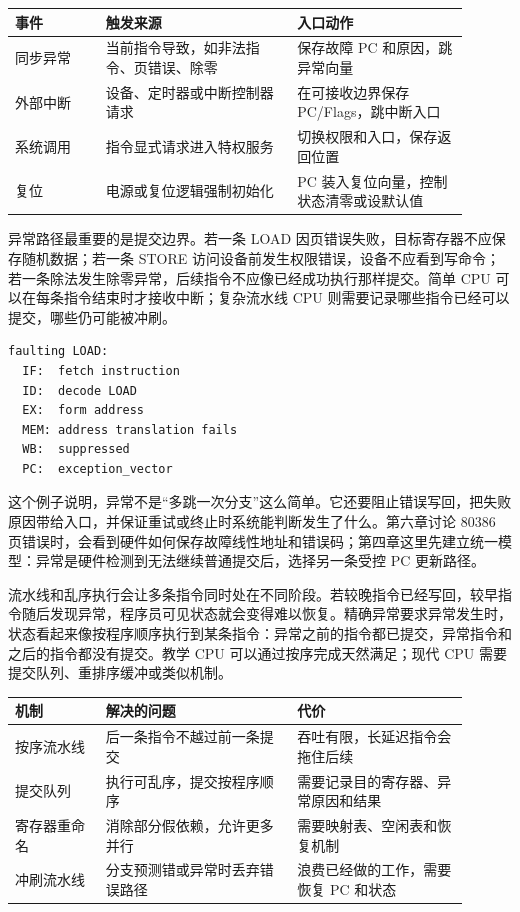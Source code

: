 \begin{longtable}{L{0.18\linewidth}L{0.38\linewidth}L{0.34\linewidth}}
\toprule
事件 & 触发来源 & 入口动作 \\
\midrule
同步异常 & 当前指令导致，如非法指令、页错误、除零 & 保存故障 PC 和原因，跳异常向量 \\
外部中断 & 设备、定时器或中断控制器请求 & 在可接收边界保存 PC/Flags，跳中断入口 \\
系统调用 & 指令显式请求进入特权服务 & 切换权限和入口，保存返回位置 \\
复位 & 电源或复位逻辑强制初始化 & PC 装入复位向量，控制状态清零或设默认值 \\
\bottomrule
\end{longtable}

异常路径最重要的是提交边界。若一条 LOAD 因页错误失败，目标寄存器不应保存随机数据；若一条 STORE 访问设备前发生权限错误，设备不应看到写命令；若一条除法发生除零异常，后续指令不应像已经成功执行那样提交。简单 CPU 可以在每条指令结束时才接收中断；复杂流水线 CPU 则需要记录哪些指令已经可以提交，哪些仍可能被冲刷。

\begin{lstlisting}
faulting LOAD:
  IF:  fetch instruction
  ID:  decode LOAD
  EX:  form address
  MEM: address translation fails
  WB:  suppressed
  PC:  exception_vector
\end{lstlisting}

这个例子说明，异常不是“多跳一次分支”这么简单。它还要阻止错误写回，把失败原因带给入口，并保证重试或终止时系统能判断发生了什么。第六章讨论 80386 页错误时，会看到硬件如何保存故障线性地址和错误码；第四章这里先建立统一模型：异常是硬件检测到无法继续普通提交后，选择另一条受控 PC 更新路径。

流水线和乱序执行会让多条指令同时处在不同阶段。若较晚指令已经写回，较早指令随后发现异常，程序员可见状态就会变得难以恢复。精确异常要求异常发生时，状态看起来像按程序顺序执行到某条指令：异常之前的指令都已提交，异常指令和之后的指令都没有提交。教学 CPU 可以通过按序完成天然满足；现代 CPU 需要提交队列、重排序缓冲或类似机制。

\begin{longtable}{L{0.18\linewidth}L{0.38\linewidth}L{0.34\linewidth}}
\toprule
机制 & 解决的问题 & 代价 \\
\midrule
按序流水线 & 后一条指令不越过前一条提交 & 吞吐有限，长延迟指令会拖住后续 \\
提交队列 & 执行可乱序，提交按程序顺序 & 需要记录目的寄存器、异常原因和结果 \\
寄存器重命名 & 消除部分假依赖，允许更多并行 & 需要映射表、空闲表和恢复机制 \\
冲刷流水线 & 分支预测错或异常时丢弃错误路径 & 浪费已经做的工作，需要恢复 PC 和状态 \\
\bottomrule
\end{longtable}

